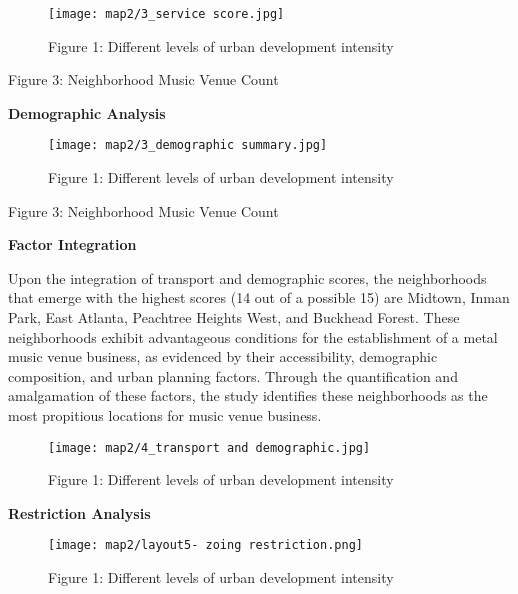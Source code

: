 \documentclass[11pt]{article}
\begin{document}
\begin{figure}[H]
\begin{center}
\centering
\texttt{[image: map2/3\_service score.jpg]}
\caption{Figure 1: Different levels of urban development intensity}
\label{fig:figure1}
\end{center}
\end{figure}

\begin{center}
\centering
Figure 3: Neighborhood Music Venue Count
\end{center}


\textbf{Demographic Analysis}



\begin{figure}[H]
\begin{center}
\centering
\texttt{[image: map2/3\_demographic summary.jpg]}
\caption{Figure 1: Different levels of urban development intensity}
\label{fig:figure1}
\end{center}
\end{figure}

\begin{center}
\centering
Figure 3: Neighborhood Music Venue Count
\end{center}


\textbf{Factor Integration}


Upon the integration of transport and demographic scores, the neighborhoods that emerge with the highest scores (14 out of a possible 15) are Midtown, Inman Park, East Atlanta, Peachtree Heights West, and Buckhead Forest. These neighborhoods exhibit advantageous conditions for the establishment of a metal music venue business, as evidenced by their accessibility, demographic composition, and urban planning factors. Through the quantification and amalgamation of these factors, the study identifies these neighborhoods as the most propitious locations for music venue business.

\begin{figure}[H]
\begin{center}
\centering
\texttt{[image: map2/4\_transport and demographic.jpg]}
\caption{Figure 1: Different levels of urban development intensity}
\label{fig:figure1}
\end{center}
\end{figure}

\textbf{Restriction Analysis}

\begin{figure}[H]
\begin{center}
\centering
\texttt{[image: map2/layout5- zoing restriction.png]}
\caption{Figure 1: Different levels of urban development intensity}
\label{fig:figure1}
\end{center}
\end{figure}
\end{document}
